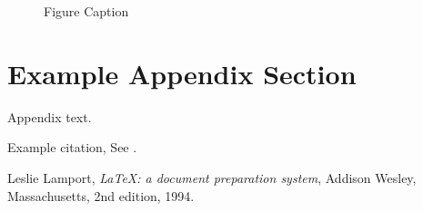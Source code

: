 \documentclass[preprint,12pt,authoryear]{elsarticle}
\begin{document}
\begin{figure}[t]%
  \centering%
  \caption{Figure Caption}\label{fig1}
\end{figure}


\appendix
\section{Example Appendix Section}
\label{app1}

Appendix text.

Example citation, See \citet{lamport94}.




\begin{thebibliography}{00}


  Leslie Lamport,
  \textit{\LaTeX: a document preparation system},
  Addison Wesley, Massachusetts,
  2nd edition,
  1994.

\end{thebibliography}
\end{document}
